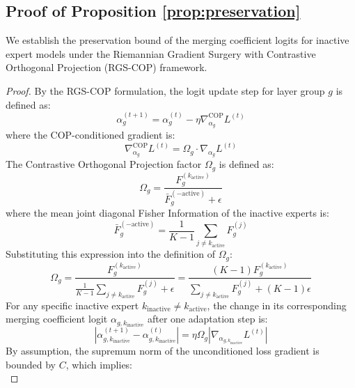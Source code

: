 \documentclass{article}
\theoremstyle{plain}
\theoremstyle{definition}
\theoremstyle{remark}
\begin{document}
\subsection{Proof of Proposition \ref{prop:preservation}}
We establish the preservation bound of the merging coefficient logits for inactive expert models under the Riemannian Gradient Surgery with Contrastive Orthogonal Projection (RGS-COP) framework.

\begin{proof}
By the RGS-COP formulation, the logit update step for layer group $g$ is defined as:
\begin{equation}
    \alpha^{(t+1)}_g = \alpha^{(t)}_g - \eta \nabla^{\text{COP}}_{\alpha_g} L^{(t)}
\end{equation}
where the COP-conditioned gradient is:
\begin{equation}
    \nabla^{\text{COP}}_{\alpha_g} L^{(t)} = \Omega_g \cdot \nabla_{\alpha_g} L^{(t)}
\end{equation}
The Contrastive Orthogonal Projection factor $\Omega_g$ is defined as:
\begin{equation}
    \Omega_g = \frac{F^{(k_{\text{active}})}_g}{\bar{F}^{(-\text{active})}_g + \epsilon}
\end{equation}
where the mean joint diagonal Fisher Information of the inactive experts is:
\begin{equation}
    \bar{F}^{(-\text{active})}_g = \frac{1}{K-1} \sum_{j \neq k_{\text{active}}} F^{(j)}_g
\end{equation}
Substituting this expression into the definition of $\Omega_g$:
\begin{equation}
    \Omega_g = \frac{F^{(k_{\text{active}})}_g}{\frac{1}{K-1} \sum_{j \neq k_{\text{active}}} F^{(j)}_g + \epsilon} = \frac{(K-1)F^{(k_{\text{active}})}_g}{\sum_{j \neq k_{\text{active}}} F^{(j)}_g + (K-1)\epsilon}
\end{equation}
For any specific inactive expert $k_{\text{inactive}} \neq k_{\text{active}}$, the change in its corresponding merging coefficient logit $\alpha_{g, k_{\text{inactive}}}$ after one adaptation step is:
\begin{equation}
    \left| \alpha^{(t+1)}_{g, k_{\text{inactive}}} - \alpha^{(t)}_{g, k_{\text{inactive}}} \right| = \eta \Omega_g \left| \nabla_{\alpha_{g, k_{\text{inactive}}}} L^{(t)} \right|
\end{equation}
By assumption, the supremum norm of the unconditioned loss gradient is bounded by $C$, which implies:
\begin{equation}

\end{equation}
\end{proof}
\end{document}
